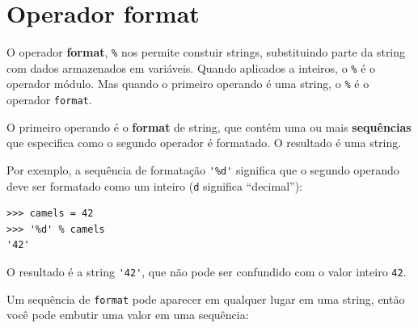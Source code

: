 {\section{Operador format}



O operador {\bf format}, {\tt \%} nos permite constuir strings, substituindo
parte da string com dados armazenados em variáveis. Quando aplicados a
inteiros, o {\tt \%} é o operador módulo. Mas quando o primeiro operando é
uma string, o {\tt \%} é o operador {\tt format}.



O primeiro operando é o {\bf format} de string, que contém uma ou mais
{\bf sequências} que especifica como o segundo operador é formatado. O
resultado é uma string.



Por exemplo, a sequência de formatação \verb"'%d'" significa que o segundo
operando deve ser formatado como um inteiro ({\tt d} significa ``decimal''):

\beforeverb
\begin{verbatim}
>>> camels = 42
>>> '%d' % camels
'42'
\end{verbatim}
\afterverb
%
%
O resultado é a string \verb"'42'", que não pode ser confundido com o valor
inteiro {\tt 42}.


Um sequência de {\tt format} pode aparecer em qualquer lugar em uma string,
então você pode embutir uma valor em uma sequência:

}
